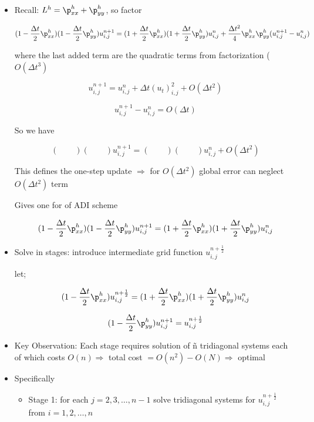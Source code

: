 \begin{itemize}
    \item Recall: $L^h = \p_{xx}^h + \p_{yy}^h$, so factor

    \[ (1-\frac{\Delta t}{2} \p_{xx}^h)(1-\frac{\Delta t}{2} \p_{yy}^h) u_{i,j}^{n+1} = (1+\frac{\Delta t}{2} \p_{xx}^h)(1+\frac{\Delta t}{2} \p_{yy}^h) u_{i,j}^{n} + \frac{\Delta t^2}{4} \p_{xx}^h \p_{yy}^h (u_{i,j}^{n+1}-u_{i,j}^n)\]

    where the last added term are the quadratic terms from factorization ($O(\Delta t^3)$

    \[ u_{i,j}^{n+1} = u_{i,j}^{n} + \Delta t(u_t)_{i,j}^2 + O(\Delta t^2)\]

    \[ u_{i,j}^{n+1} - u_{i,j}^{n} = O(\Delta t) \]

    So we have

    \[ (\qquad )(\qquad ) u_{i,j}^{n+1} = (\qquad)(\qquad)u_{i,j}^{n} + O(\Delta t^2)\]

    This defines the one-step update $\Rightarrow$ for $O(\Delta t^2)$ global error can neglect $O(\Delta t^2)$ term

    Gives one for of ADI scheme

    \begin{equation}
        (1-\frac{\Delta t}{2} \p_{xx}^h )(1-\frac{\Delta t}{2}\p_{yy}^h) u_{i,j}^{n+1} = (1+\frac{\Delta t}{2} \p_{xx}^h)(1+\frac{\Delta t}{2} \p_{yy}^h) u_{i,j}^{n}
    \end{equation}

    \item Solve in stages: introduce intermediate grid function $u_{i,j}^{n+\frac{1}{2}}$

    let;

    \begin{equation}
        (1-\frac{\Delta t}{2} \p_{xx}^h ) u_{i,j}^{n+\frac{1}{2}} = (1+\frac{\Delta t}{2} \p_{xx}^h)(1+\frac{\Delta t}{2} \p_{yy}^h) u_{i,j}^{n}
    \end{equation}
    
    \begin{equation}
        (1-\frac{\Delta t}{2}\p_{yy}^h) u_{i,j}^{n+1}  = u_{i,j}^{n+\frac{1}{2}} 
    \end{equation}

    \item Key Observation: Each stage requires solution of \~ n tridiagonal systems each of which costs $O(n) \Rightarrow $ total cost $ = O(n^2) - O(N) \Rightarrow$ optimal

    \item Specifically
    \begin{itemize}
        \item Stage 1: for each $j=2,3,\ldots,n-1$ solve tridiagonal systems for $u_{i,j}^{n+\frac{1}{2}}$ from $i=1,2,\ldots, n$


\end{itemize}
\end{itemize}

